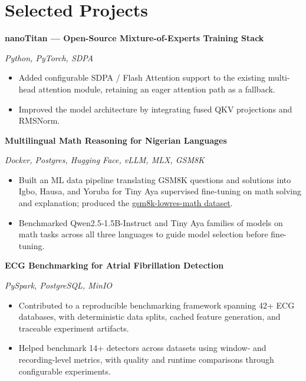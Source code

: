 \documentclass[11pt]{article}
\newcommand{\project}[2]{\textbf{#1}\par{\small\textit{#2}}\par}
\begin{document}
\section{Selected Projects}
\project{nanoTitan --- Open-Source Mixture-of-Experts Training Stack}{Python, PyTorch, SDPA}
\begin{itemize}
    \item Added configurable SDPA / Flash Attention support to the existing multi-head attention module, retaining an eager attention path as a fallback.
    \item Improved the model architecture by integrating fused QKV projections and RMSNorm.
\end{itemize}
\vspace{6pt}
\project{Multilingual Math Reasoning for Nigerian Languages}{Docker, Postgres, Hugging Face, vLLM, MLX, GSM8K}
\begin{itemize}
    \item Built an ML data pipeline translating GSM8K questions and solutions into Igbo, Hausa, and Yoruba for Tiny Aya supervised fine-tuning on math solving and explanation; produced the \href{https://huggingface.co/datasets/dayveedd/gsm8k-lowres-math}{\underline{gsm8k-lowres-math dataset}}.
    \item Benchmarked Qwen2.5-1.5B-Instruct and Tiny Aya families of models on math tasks across all three languages to guide model selection before fine-tuning.
\end{itemize}
\vspace{6pt}
\project{ECG Benchmarking for Atrial Fibrillation Detection}{PySpark, PostgreSQL, MinIO}
\begin{itemize}
    \item Contributed to a reproducible benchmarking framework spanning 42+ ECG databases, with deterministic data splits, cached feature generation, and traceable experiment artifacts.
    \item Helped benchmark 14+ detectors across datasets using window- and recording-level metrics, with quality and runtime comparisons through configurable experiments.
\end{itemize}
\newpage
\end{document}
